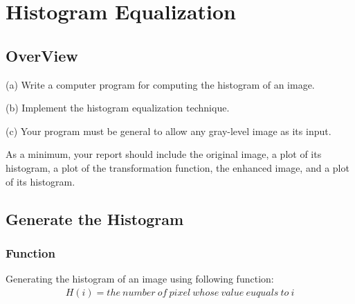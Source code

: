 \documentclass[11pt,oneside]{book}
\begin{document}


\tableofcontents

\chapter{Histogram Equalization}

\section{OverView}
(a) Write a computer program for computing the histogram of an image.

(b) Implement the histogram equalization technique.

(c) Your program must be general to allow any gray-level image as its input.

As a minimum, your report should include the original image, a plot of its histogram, a plot of the transformation function, the enhanced image, and a plot of its histogram.
\section{Generate the Histogram}
\subsection{Function}
Generating the histogram of an image using following function:\\
\begin{align}
H(i) = the\ number\ of\ pixel\ whose\ value\ euquals\ to\ i
\end{align}
\end{document}
